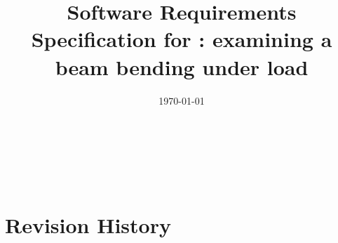 \documentclass[12pt]{article}
\begin{document}
\ifcomments
    \todototoc
    \listoftodos
    \newpage
\fi


\title{Software Requirements Specification for \progname{}: examining a beam
    bending under load}
\author{\authname}
\date{\today}

\maketitle

~\newpage


\tableofcontents

~\newpage


\section*{Revision History}
\end{document}
